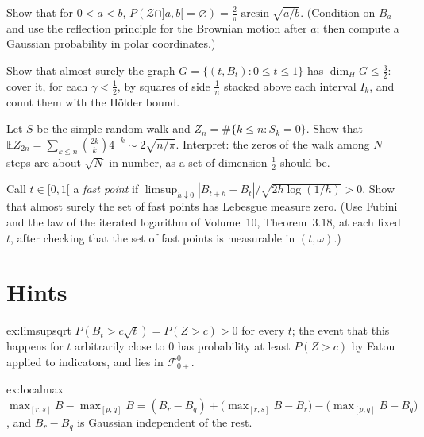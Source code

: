 \begin{exercise}[$\star\star$]\label{ex:nozero}
Show that for $0<a<b$, $P(\mathcal Z\cap]a,b[=\varnothing)=\frac2\pi\arcsin\sqrt{a/b}$. (Condition on $B_a$ and use the reflection principle for the Brownian motion after $a$; then compute a Gaussian probability in polar
coordinates.)
\end{exercise}

\begin{exercise}[$\star\star$]\label{ex:graph}
Show that almost surely the graph $G=\{(t,B_t):0\le t\le1\}$ has $\dim_HG\le\frac32$: cover it, for each $\gamma<\frac12$, by squares of side $\frac1n$ stacked above each interval $I_k$, and count them with the H\"older bound.
\end{exercise}

\begin{exercise}[$\star\star$]\label{ex:walkzeros}
Let $S$ be the simple random walk and $Z_n=\#\{k\le n:S_k=0\}$. Show that $\mathbb E Z_{2n}=\sum_{k\le n}\binom{2k}k4^{-k}\sim2\sqrt{n/\pi}$. Interpret: the zeros of the walk among $N$ steps are about $\sqrt N$ in number,
as a set of dimension $\frac12$ should be.
\end{exercise}

\begin{exercise}[$\star\star\star$]\label{ex:fast}
Call $t\in[0,1[$ a \emph{fast point} if $\limsup_{h\downarrow0}|B_{t+h}-B_t|/\sqrt{2h\log(1/h)}>0$. Show that almost surely the set of fast points has Lebesgue measure zero. (Use Fubini and the law of the iterated
logarithm of Volume~10, Theorem~3.18, at each fixed $t$, after checking that the set of fast points is measurable in $(t,\omega)$.)
\end{exercise}

\section{Hints}

\begin{hint}{ex:limsupsqrt}
$P(B_t>c\sqrt t)=P(Z>c)>0$ for every $t$; the event that this happens for $t$ arbitrarily close to $0$ has probability at least $P(Z>c)$ by Fatou applied to indicators, and lies in $\mathcal F^0_{0+}$.
\end{hint}

\begin{hint}{ex:localmax}
$\max_{[r,s]}B-\max_{[p,q]}B=(B_r-B_q)+\bigl(\max_{[r,s]}B-B_r\bigr)-\bigl(\max_{[p,q]}B-B_q\bigr)$, and $B_r-B_q$ is Gaussian independent of the rest.
\end{hint}

